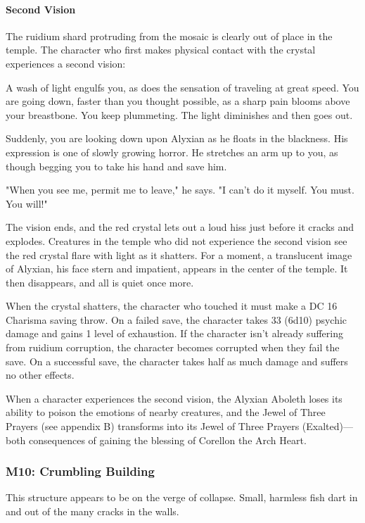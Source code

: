 \documentclass[10pt,a4paper,twoside,bg=print,twocolumn,openany,nodeprecatedcode]{dndbook}
\begin{document}
\paragraph{Second Vision}
The ruidium shard protruding from the mosaic is clearly out of place in the temple. The character who first makes physical contact with the crystal experiences a second vision:

\begin{DndReadAloud}{}
A wash of light engulfs you, as does the sensation of traveling at great speed. You are going down, faster than you thought possible, as a sharp pain blooms above your breastbone. You keep plummeting. The light diminishes and then goes out.

Suddenly, you are looking down upon Alyxian as he floats in the blackness. His expression is one of slowly growing horror. He stretches an arm up to you, as though begging you to take his hand and save him.

"When you see me, permit me to leave," he says. "I can't do it myself. You must. You will!"

\end{DndReadAloud}

The vision ends, and the red crystal lets out a loud hiss just before it cracks and explodes. Creatures in the temple who did not experience the second vision see the red crystal flare with light as it shatters. For a moment, a translucent image of Alyxian, his face stern and impatient, appears in the center of the temple. It then disappears, and all is quiet once more.

When the crystal shatters, the character who touched it must make a DC 16 Charisma saving throw. On a failed save, the character takes 33 (6d10) psychic damage and gains 1 level of exhaustion. If the character isn't already suffering from ruidium corruption, the character becomes corrupted when they fail the save. On a successful save, the character takes half as much damage and suffers no other effects.

When a character experiences the second vision, the Alyxian Aboleth loses its ability to poison the emotions of nearby creatures, and the Jewel of Three Prayers (see appendix B) transforms into its Jewel of Three Prayers (Exalted)—both consequences of gaining the blessing of Corellon the Arch Heart.

\subsubsection{M10: Crumbling Building}
This structure appears to be on the verge of collapse. Small, harmless fish dart in and out of the many cracks in the walls.
\end{document}
